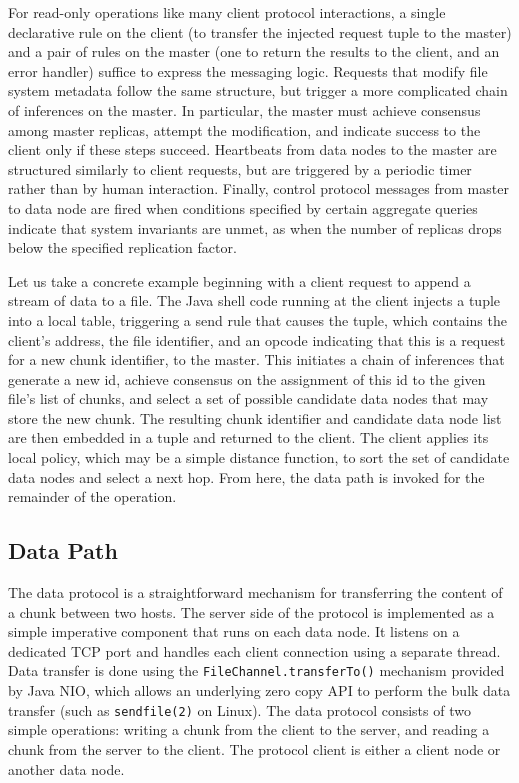 \documentclass[twocolumn]{article}
\begin{document}
For read-only operations like many client protocol interactions, a
single declarative rule on the client (to transfer the injected
request tuple to the master) and a pair of rules on the master (one to
return the results to the client, and an error handler) suffice to
express the messaging logic.  Requests that modify file system
metadata follow the same structure, but trigger a more complicated
chain of inferences on the master.  In particular, the master must
achieve consensus among master replicas, attempt the modification, and
indicate success to the client only if these steps succeed.
Heartbeats from data nodes to the master are structured similarly to
client requests, but are triggered by a periodic timer rather than by
human interaction.  Finally, control protocol messages from master to
data node are fired when conditions specified by certain aggregate
queries indicate that system invariants are unmet, as when the number
of replicas drops below the specified replication factor.

Let us take a concrete example beginning with a client request to
append a stream of data to a file.  The Java shell code running at the
client injects a tuple into a local table, triggering a send rule that
causes the tuple, which contains the client's address, the file
identifier, and an opcode indicating that this is a request for a new
chunk identifier, to the master.  This initiates a chain of inferences
that generate a new id, achieve consensus on the assignment of this id
to the given file's list of chunks, and select a set of possible
candidate data nodes that may store the new chunk.  The resulting
chunk identifier and candidate data node list are then embedded in a
tuple and returned to the client.  The client applies its local
policy, which may be a simple distance function, to sort the set of
candidate data nodes and select a next hop.  From here, the data path
is invoked for the remainder of the operation.

\subsection{Data Path}
The data protocol is a straightforward mechanism for transferring the
content of a chunk between two hosts. The server side of the protocol
is implemented as a simple imperative component that runs on each data
node. It listens on a dedicated TCP port and handles each client
connection using a separate thread. Data transfer is done using the
\texttt{FileChannel.transferTo()} mechanism provided by Java NIO,
which allows an underlying zero copy API to perform the bulk data
transfer (such as \texttt{sendfile(2)} on Linux). The data protocol
consists of two simple operations: writing a chunk from the client to
the server, and reading a chunk from the server to the client. The
protocol client is either a client node or another data node.
\end{document}
